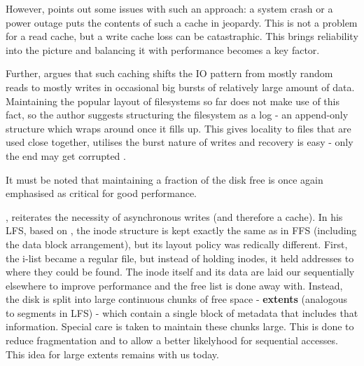             However, \citeauthor{IO_bottleneck} points out some issues with
            such an approach: a system crash or a power outage puts the
            contents of such a cache in jeopardy. This is not a problem for a
            read cache, but a write cache loss can be catastraphic. This brings
            reliability into the picture and balancing it with performance
            becomes a key factor.

            Further, \citeauthor{IO_bottleneck} argues that such caching shifts
            the IO pattern from mostly random reads to mostly writes in
            occasional big bursts of relatively large amount of data.
            Maintaining the popular layout of filesystems so far does not make
            use of this fact, so the author suggests structuring the filesystem
            as a log - an append-only structure which wraps around once it
            fills up. This gives locality to files that are used close
            together, utilises the burst nature of writes and recovery is easy
            - only the end may get corrupted \cite{IO_bottleneck}.

            It must be noted that maintaining a fraction of the disk free is
            once again emphasised as critical for good performance. %

            \citeauthor{LFS}, reiterates the necessity of asynchronous writes
            (and therefore a cache). In his LFS, based on \cite{IO_bottleneck},
            the inode structure is kept exactly the same as in FFS (including
            the data block arrangement), but its layout policy was redically
            different. First, the i-list became a regular file, but instead of
            holding inodes, it held addresses to where they could be found. The
            inode itself and its data are laid our sequentially elsewhere to
            improve performance and the free list is done away with. Instead,
            the disk is split into large continuous chunks of free space -
            \textbf{extents} (analogous to segments in LFS) - which contain a
            single block of metadata that includes that information.  Special
            care is taken to maintain these chunks large. This is done to
            reduce fragmentation and to allow a better likelyhood for
            sequential accesses. This idea for large extents remains with us
            today.

